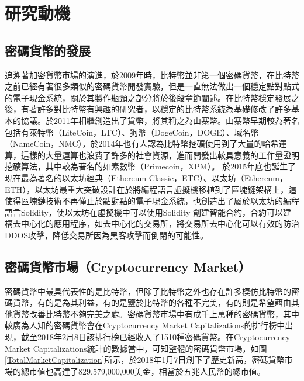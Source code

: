 
\chapter{研究動機}
	\section{密碼貨幣的發展}
	追溯著加密貨幣市場的演進，於2009年時，比特幣並非第一個密碼貨幣，在比特幣之前已經有著很多類似的密碼貨幣開發實驗，但是一直無法做出一個穩定點對點式的電子現金系統，關於其製作瓶頸之部分將於後段章節闡述。在比特幣穩定發展之後，有著許多對比特幣有興趣的研究者，以穩定的比特幣系統為基礎修改了許多基本的協議。於2011年相繼創造出了貨幣，將其稱之為⼭寨幣。山寨幣早期較為著名包括有萊特幣（LiteCoin，LTC）\supercite{litecoin}、狗幣（DogeCoin，DOGE）\supercite{dogecoin}、域名幣（NameCoin，NMC）\supercite{namecoin}，於2014年也有人認為比特幣挖礦使用到了大量的哈希運算，這樣的大量運算也浪費了許多的社會資源，進而開發出較具意義的工作量證明挖礦算法，其中較為著名的如素數幣（Primecoin，XPM）\supercite{primecoin}。 於2015年底也誕生了現在最為著名的以太坊經典（Ethereum Classic，ETC）\supercite{ethereumclassic}、以太坊（Ethereum，ETH）\supercite{ethereum}，以太坊最重⼤突破設計在於將編程語⾔虛擬機移植到了區塊鏈架構上，這使得區塊鏈技術不再僅止於點對點的電⼦現⾦系統，也創造出了屬於以太坊的編程語言Solidity，使以太坊在虛擬機中可以使⽤Solidity 創建智能合約，合約可以建構去中心化的應用程序，如去中心化的交易所，將交易所去中心化可以有效的防治DDOS攻擊，降低交易所因為黑客攻擊而倒閉的可能性。

	\section{密碼貨幣市場（Cryptocurrency Market）}
	密碼貨幣中最具代表性的是比特幣，但除了比特幣之外也存在許多模仿比特幣的密碼貨幣，有的是為其利益，有的是鑒於比特幣的各種不完美，有的則是希望藉由其他貨幣改善⽐特幣不夠完美之處。密碼貨幣市場中有成千上萬種的密碼貨幣，其中較廣為人知的密碼貨幣會在Cryptocurrency Market Capitalizations\supercite{CryptocurrencyMarketCapitalizations}的排行榜中出現，截至2018年2月8日該排行榜已經收入了1510種密碼貨幣。在Cryptocurrency Market Capitalizations統計的數據當中，可知整體的密碼貨幣市場，如圖\ref{TotalMarketCapitalization}所示，於2018年1月7日創下了歷史新高，密碼貨幣市場的總市值也高達了829,579,000,000美金，相當於五兆人民幣的總市值。

